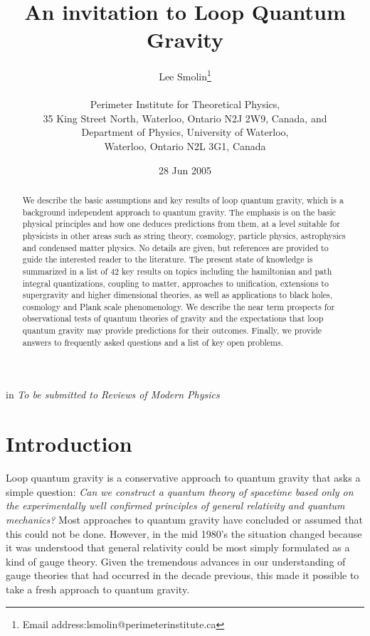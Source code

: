 \documentclass[12pt]{article}
\begin{document}
\title{An invitation to  Loop Quantum Gravity}
\author{ Lee Smolin\thanks{Email address:lsmolin@perimeterinstitute.ca}
\\
\\
Perimeter Institute for Theoretical Physics,\\
35 King Street North, Waterloo, Ontario N2J 2W9, Canada, and \\
Department of Physics, University of Waterloo,\\
Waterloo, Ontario N2L 3G1, Canada\\}
\date{28 Jun 2005}
\maketitle

\begin{abstract}

We describe the basic assumptions and key results   
of loop quantum  gravity, which is a background independent  approach to quantum gravity. 
The emphasis is on the basic physical
principles and how one deduces predictions from them, at a level
suitable for physicists in other areas such as string theory,
cosmology, particle physics, astrophysics and condensed matter physics. 
No details are given, but references are provided to guide 
the interested reader to the literature.  The present state of
knowledge is summarized in a list of  $42$ key results on topics including
the hamiltonian and path integral quantizations, coupling to matter, 
approaches to unification, 
 extensions to supergravity
and higher dimensional theories, as well as applications to
black holes, cosmology and Plank scale phenomenology. 
We describe  the near term 
prospects for observational tests of quantum theories of gravity and the 
expectations that loop quantum gravity may provide predictions for 
their outcomes. Finally, we  provide  answers to frequently asked
questions and a list of key open problems.

\end{abstract}
 in
{\it To be submitted to Reviews of Modern Physics}
 \newpage
\tableofcontents
\newpage

\section{Introduction}
  
Loop quantum gravity is a conservative  approach to quantum gravity that asks a  
simple question: {\it Can we construct a quantum theory of 
spacetime based only on the experimentally well confirmed principles 
of general relativity and quantum mechanics?}  Most approaches to quantum gravity
have concluded or assumed that this could not be done.  However, in the mid 1980's the
situation changed because it was understood that general relativity could be most simply formulated
as a kind of gauge theory\cite{sen,abhay}.  Given the tremendous advances in our
understanding of gauge theories that had occurred in the decade previous, this made it
possible to take a fresh approach to quantum gravity.   
  
\end{document}
